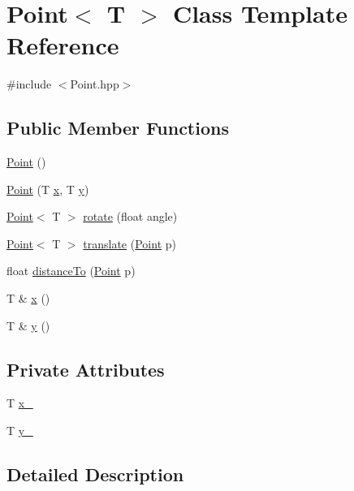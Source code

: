 \hypertarget{classPoint}{\section{Point$<$ T $>$ Class Template Reference}
\label{classPoint}
}


{\ttfamily \#include $<$Point.\-hpp$>$}

\subsection*{Public Member Functions}
\begin{DoxyCompactItemize}
\item 
\hyperlink{classPoint_aea76b1130f1a203722d8f2254ced8e66}{Point} ()
\item 
\hyperlink{classPoint_a4236452aa9c9f4cffc58b04180fea343}{Point} (T \hyperlink{classPoint_a97a274fff44375b5d60e209f26d7382f}{x}, T \hyperlink{classPoint_a71672fd35753d43129ff157127dba575}{y})
\item 
\hyperlink{classPoint}{Point}$<$ T $>$ \hyperlink{classPoint_a21b0a6ce6c6041b23604a27121786902}{rotate} (float angle)
\item 
\hyperlink{classPoint}{Point}$<$ T $>$ \hyperlink{classPoint_a5b03fdd5ae61621155265d59502a1beb}{translate} (\hyperlink{classPoint}{Point} p)
\item 
float \hyperlink{classPoint_a02969e7eccf9468f0b1d9572ae0800c9}{distance\-To} (\hyperlink{classPoint}{Point} p)
\item 
T \& \hyperlink{classPoint_a97a274fff44375b5d60e209f26d7382f}{x} ()
\item 
T \& \hyperlink{classPoint_a71672fd35753d43129ff157127dba575}{y} ()
\end{DoxyCompactItemize}
\subsection*{Private Attributes}
\begin{DoxyCompactItemize}
\item 
T \hyperlink{classPoint_a24a41ccfbe19d2318d94966128af271a}{x\-\_\-}
\item 
T \hyperlink{classPoint_a54b6f0a7faf44dd0263d57e332d266ad}{y\-\_\-}
\end{DoxyCompactItemize}


\subsection{Detailed Description}
